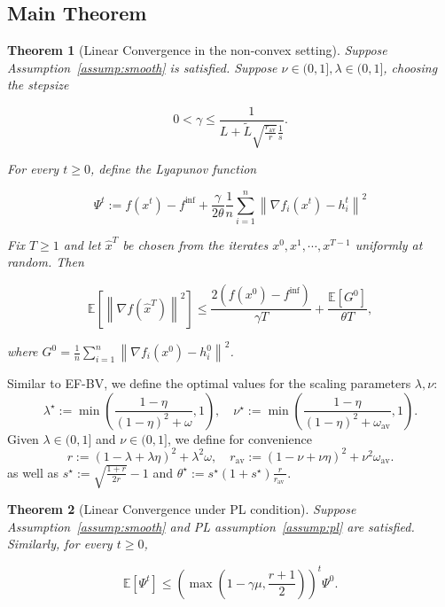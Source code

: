 \documentclass{article} %
\newcommand{\algname}[1]{{\sf\green\relscale{0.90}#1}\xspace}
\theoremstyle{plain}
\newtheorem{theorem}{Theorem}[section]
\theoremstyle{definition}
\theoremstyle{remark}
\newcommand{\green}{\color{mydarkgreen}}
\newcommand{\sqnorm}[1]{\left\| #1 \right\|^2}
\begin{document}
\subsection{Main Theorem}
\begin{theorem}[Linear Convergence in the non-convex setting]\label{thm:main}
   Suppose Assumption~\ref{assump:smooth} is satisfied. Suppose $\nu\in (0, 1], \lambda\in (0,1]$, choosing the stepsize 
   
   $$0< \gamma \leq \frac{1}{L + \tilde{L}\sqrt{\frac{r_{\mathrm{av}}}{r}}\frac{1}{s}}.$$

   For every $t\geq 0$, define the Lyapunov function

   \begin{equation}
      \Psi^{t}:=f\left(x^{t}\right)-f^{\inf}+\frac{\gamma}{2 \theta} \frac{1}{n} \sum_{i=1}^{n}\left\|\nabla f_{i}\left(x^{t}\right)-h_{i}^{t}\right\|^{2}
      \end{equation}
   
   Fix $T\geq 1$ and let $\hat{x}^T$ be chosen from the iterates $x^0, x^1, \cdots, x^{T-1}$ uniformly at random. Then 

   \begin{equation}
      \mathbb{E}\left[\left\|\nabla f\left(\hat{x}^{T}\right)\right\|^{2}\right] \leq \frac{2\left(f\left(x^{0}\right)-f^{\inf}\right)}{\gamma T}+\frac{\mathbb{E}\left[G^{0}\right]}{\theta T},
      \end{equation}

   where $G^0=\frac{1}{n}\sum_{i=1}^n \sqnorm{\nabla f_i(x^0) - h_i^0}$.
\end{theorem}

Similar to \algname{EF-BV}, we define the optimal values for the scaling parameters $\lambda, \nu$:
$$
\lambda^{\star}:=\min \left(\frac{1-\eta}{(1-\eta)^{2}+\omega}, 1\right), \quad \nu^{\star}:=\min \left(\frac{1-\eta}{(1-\eta)^{2}+\omega_{\mathrm{av}}}, 1\right) .
$$
Given $\lambda \in(0,1]$ and $\nu \in(0,1]$, we define for convenience
$$
r:=(1-\lambda+\lambda \eta)^{2}+\lambda^{2} \omega, \quad r_{\mathrm{av}}:=(1-\nu+\nu \eta)^{2}+\nu^{2} \omega_{\mathrm{av}} .
$$
as well as $s^{\star}:=\sqrt{\frac{1+r}{2 r}}-1$ and $\theta^{\star}:=s^{\star}\left(1+s^{\star}\right) \frac{r}{r_{\text {av }}}$.

\begin{theorem}[Linear Convergence under PL condition]\label{thm:main_pl}
   Suppose Assumption~\ref{assump:smooth} and PL assumption~\ref{assump:pl} are satisfied. Similarly, for every $t\geq 0$, 

   \begin{equation}
      \mathbb{E}\left[\Psi^{t}\right] \leq\left(\max \left(1-\gamma \mu, \frac{r+1}{2}\right)\right)^{t} \Psi^{0}.
      \end{equation}
\end{theorem}
\end{document}
